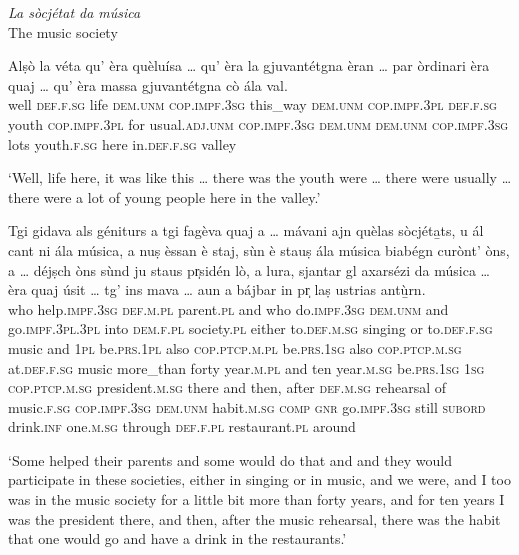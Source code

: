\textit{La sòcjétat da música}\\
The music society\\
\medskip

\begin{linenumbers}
\gll    Alṣò la véta qu' èra quèluísa … qu’ èra la gjuvantétgna èran … par òrdinari èra quaj … qu’ èra massa gjuvantétgna cò ála val. \\
 well \textsc{def.f.sg} life \textsc{dem.unm} \textsc{cop.impf.3sg} this\_way {} \textsc{dem.unm} \textsc{cop.impf.3pl} \textsc{def.f.sg} youth \textsc{cop.impf.3pl} {} for usual.\textsc{adj.unm} \textsc{cop.impf.3sg} \textsc{dem.unm} {} \textsc{dem.unm} \textsc{cop.impf.3sg} lots youth.\textsc{f.sg}  here in.\textsc{def.f.sg} valley\\
\end{linenumbers}
\medskip
\glt `Well, life here, it was like this … there was the youth were … there were usually … there were a lot of young people here in the valley.'
\medskip

\begin{linenumbers}
\gll    Tgi gidava als géniturs a tgi fagèva quaj a … mávani ajn quèlas sòcjéta̱ts, u ál cant ni ála música, a nuṣ èssan è staj, sùn è stauṣ ála música biabégn curònt' òns, a … déjṣch òns sùnd ju staus pr̩sidén lò, a lura, sjantar gl axarsézi da música … èra quaj úsit … tg’ ins mava … aun a bájbar in pr̩ laṣ ustrias antù̱rn.\\
who help.\textsc{impf.3sg} \textsc{def.m.pl} parent.\textsc{pl} and who do.\textsc{impf.3sg}  \textsc{dem.unm} and {} go.\textsc{impf.3pl.3pl} into \textsc{dem.f.pl} society.\textsc{pl} either  to.\textsc{def.m.sg} singing or to.\textsc{def.f.sg} music and \textsc{1pl} be.\textsc{prs.1pl} also \textsc{cop.ptcp.m.pl} be.\textsc{prs.1sg} also \textsc{cop.ptcp.m.sg} at.\textsc{def.f.sg} music more\_than forty year.\textsc{m.pl} and {} ten year.\textsc{m.sg} be.\textsc{prs.1sg} \textsc{1sg} \textsc{cop.ptcp.m.sg} president.\textsc{m.sg} there and then, after \textsc{def.m.sg} rehearsal of music.\textsc{f.sg} {} \textsc{cop.impf.3sg} \textsc{dem.unm} habit.\textsc{m.sg} {} \textsc{comp} \textsc{gnr} go.\textsc{impf.3sg} {} still \textsc{subord} drink.\textsc{inf} one.\textsc{m.sg} through \textsc{def.f.pl} restaurant.\textsc{pl} around\\
\end{linenumbers}
\medskip
\glt `Some helped their parents and some would do that and and they would participate in these societies, either in singing or in music, and we were, and I too was in the music society for a little bit more than forty years, and for ten years I was the president there, and then, after the music rehearsal, there was the habit that one would go and have a drink in the restaurants.'
\medskip

